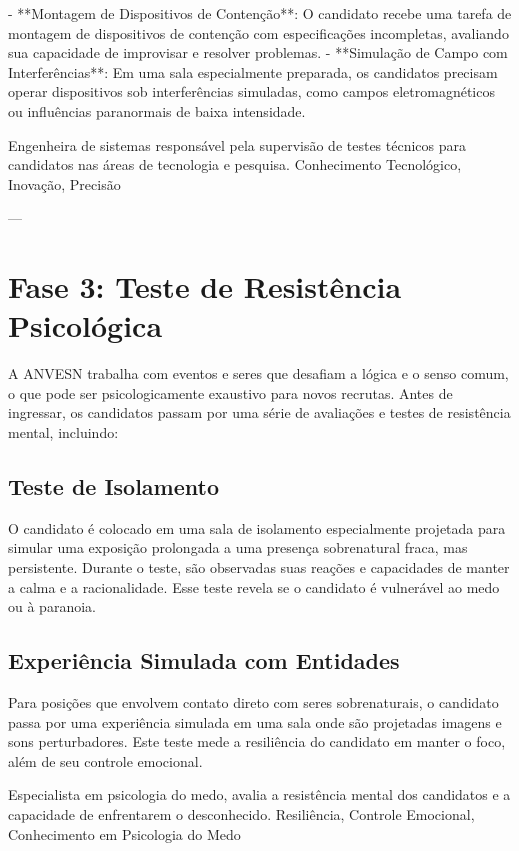- **Montagem de Dispositivos de Contenção**: O candidato recebe uma tarefa de montagem de dispositivos de contenção com especificações incompletas, avaliando sua capacidade de improvisar e resolver problemas.
- **Simulação de Campo com Interferências**: Em uma sala especialmente preparada, os candidatos precisam operar dispositivos sob interferências simuladas, como campos eletromagnéticos ou influências paranormais de baixa intensidade.

{Engenheira de sistemas responsável pela supervisão de testes técnicos para candidatos nas áreas de tecnologia e pesquisa.}
{Conhecimento Tecnológico, Inovação, Precisão}

---

\section{Fase 3: Teste de Resistência Psicológica}
A ANVESN trabalha com eventos e seres que desafiam a lógica e o senso comum, o que pode ser psicologicamente exaustivo para novos recrutas. Antes de ingressar, os candidatos passam por uma série de avaliações e testes de resistência mental, incluindo:

\subsection{Teste de Isolamento}
O candidato é colocado em uma sala de isolamento especialmente projetada para simular uma exposição prolongada a uma presença sobrenatural fraca, mas persistente. Durante o teste, são observadas suas reações e capacidades de manter a calma e a racionalidade. Esse teste revela se o candidato é vulnerável ao medo ou à paranoia.

\subsection{Experiência Simulada com Entidades}
Para posições que envolvem contato direto com seres sobrenaturais, o candidato passa por uma experiência simulada em uma sala onde são projetadas imagens e sons perturbadores. Este teste mede a resiliência do candidato em manter o foco, além de seu controle emocional.

{Especialista em psicologia do medo, avalia a resistência mental dos candidatos e a capacidade de enfrentarem o desconhecido.}
{Resiliência, Controle Emocional, Conhecimento em Psicologia do Medo}

